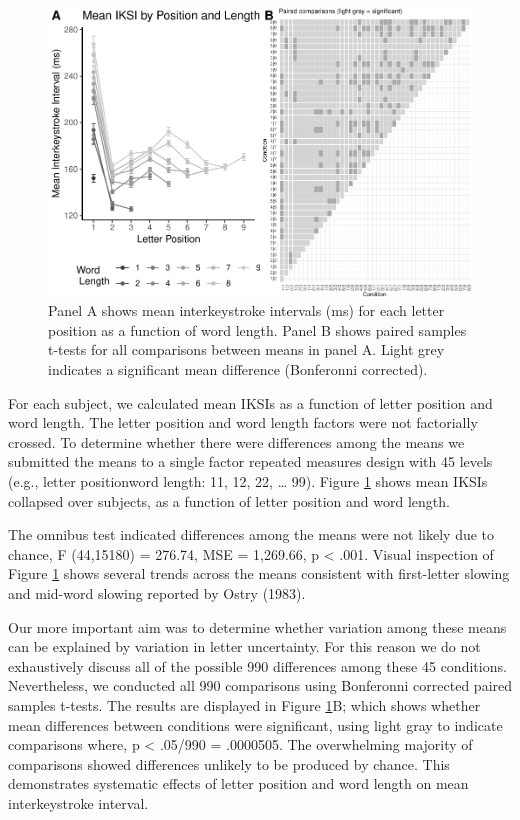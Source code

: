 \documentclass[floatsintext,man]{apa6}
\theoremstyle{definition}
\theoremstyle{definition}
\theoremstyle{definition}
\theoremstyle{remark}
\begin{document}
\begin{figure}[htbp]
\centering
\includegraphics{Entropy_typing_draft_files/figure-latex/typing-mean-iksis-comparisons-1.pdf}
\caption{\label{fig:typing-mean-iksis-comparisons}Panel A shows mean interkeystroke
intervals (ms) for each letter position as a function of word length.
Panel B shows paired samples t-tests for all comparisons between means
in panel A. Light grey indicates a significant mean difference
(Bonferonni corrected).}
\end{figure}

For each subject, we calculated mean IKSIs as a function of letter
position and word length. The letter position and word length factors
were not factorially crossed. To determine whether there were
differences among the means we submitted the means to a single factor
repeated measures design with 45 levels (e.g., letter
position\textbar{}word length: 1\textbar{}1, 1\textbar{}2, 2\textbar{}2,
\ldots{} 9\textbar{}9). Figure \ref{fig:typing-mean-iksis-comparisons}
shows mean IKSIs collapsed over subjects, as a function of letter
position and word length.

The omnibus test indicated differences among the means were not likely
due to chance, F (44,15180) = 276.74, MSE = 1,269.66, p \textless{}
.001. Visual inspection of Figure
\ref{fig:typing-mean-iksis-comparisons} shows several trends across the
means consistent with first-letter slowing and mid-word slowing reported
by Ostry (1983).

Our more important aim was to determine whether variation among these
means can be explained by variation in letter uncertainty. For this
reason we do not exhaustively discuss all of the possible 990
differences among these 45 conditions. Nevertheless, we conducted all
990 comparisons using Bonferonni corrected paired samples t-tests. The
results are displayed in Figure
\ref{fig:typing-mean-iksis-comparisons}B; which shows whether mean
differences between conditions were significant, using light gray to
indicate comparisons where, p \textless{} .05/990 = .0000505. The
overwhelming majority of comparisons showed differences unlikely to be
produced by chance. This demonstrates systematic effects of letter
position and word length on mean interkeystroke interval.
\end{document}
